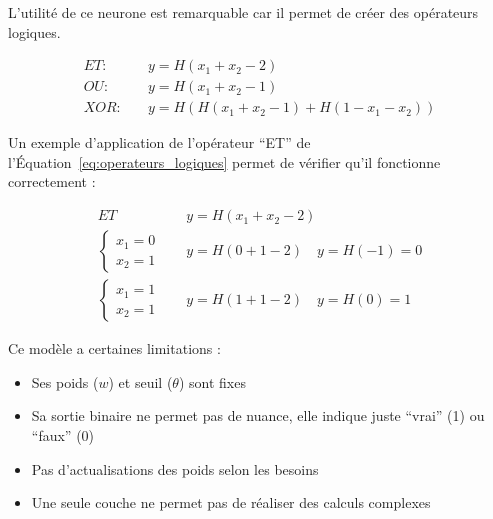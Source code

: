 \par{L'utilité de ce neurone est remarquable car il permet de créer des opérateurs logiques.}

\begin{equation}
    \begin{aligned}
        ET: \quad & y = H(x_1 + x_2 - 2) \\
        OU: \quad & y = H(x_1 + x_2 - 1) \\
        XOR: \quad & y = H(H(x_1 + x_2 - 1) + H(1 - x_1 - x_2))
    \end{aligned}
    \label{eq:operateurs_logiques}
\end{equation}

\par{Un exemple d'application de l'opérateur ``ET'' de l'Équation~\ref{eq:operateurs_logiques} permet de vérifier qu'il fonctionne correctement :}

\begin{equation}
    \begin{aligned}
        ET \quad \quad \quad & y = H(x_1 + x_2 - 2) \\
        \begin{cases}
            x_1 = 0 \\
            x_2 = 1
        \end{cases} \quad & y = H(0 + 1 - 2) \quad y = H(-1) = 0 \\
        \begin{cases}
            x_1 = 1 \\
            x_2 = 1
        \end{cases} \quad & y = H(1 + 1 - 2) \quad y = H(0) = 1
    \end{aligned}
    \label{eq:exemple_ET}
\end{equation}

\par{Ce modèle a certaines limitations :}
\begin{itemize}
    \item Ses poids ($w$) et seuil ($\theta$) sont fixes
    \item Sa sortie binaire ne permet pas de nuance, elle indique juste ``vrai'' (1) ou ``faux'' (0)
    \item Pas d'actualisations des poids selon les besoins
    \item Une seule couche ne permet pas de réaliser des calculs complexes
\end{itemize}